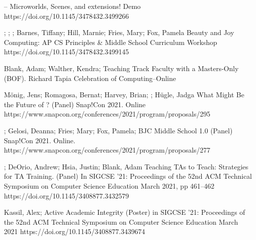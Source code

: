 \begin{etaremune}
        { – Microworlds, Scenes, and extensions!}
        {Demo}
        {https://doi.org/10.1145/3478432.3499266} 

    \sigcsePVD
        {\me; \lauren; \dan; Barnes, Tiffany; Hill, Marnie; Fries, Mary; Fox, Pamela}
        {Beauty and Joy Computing: AP CS Principles \& Middle School Curriculum}
        {Workshop}
        {https://doi.org/10.1145/3478432.3499145}
    
    \item{Blank, Adam; Walther, Kendra; \me \newline Teaching Track Faculty with a Masters-Only (BOF).
     Richard Tapia Celebration of Computing–Online
    }
    
    \item{Mönig, Jens; Romagosa, Bernat; Harvey, Brian; \me; Hügle, Jadga
    \newline
    What Might Be the Future of \snap? (Panel) Snap!Con 2021. Online
    \newline
    https://www.snapcon.org/conferences/2021/program/proposals/295}
    
    \item{\dan; Gelosi, Deanna; Fries; Mary; Fox, Pamela; \me
    \newline BJC Middle School 1.0 (Panel)
    Snap!Con 2021. Online.
    \newline
    https://www.snapcon.org/conferences/2021/program/proposals/277}

    \item{\me; DeOrio, Andrew; Hsia, Justin; Blank, Adam
    \newline Teaching TAs to Teach: Strategies for TA Training. (Panel) \newline 
    In SIGCSE '21: Proceedings of the 52nd ACM Technical Symposium on Computer Science Education March 2021, pp 461–462
    \newline
    https://doi.org/10.1145/3408877.3432579}

    \item{Kassil, Alex; \me
    \newline Active Academic Integrity (Poster)
    \newline in SIGCSE '21: Proceedings of the 52nd ACM Technical Symposium on Computer Science Education March 2021 
    \newline
    https://doi.org/10.1145/3408877.3439674
    }


\end{etaremune}

